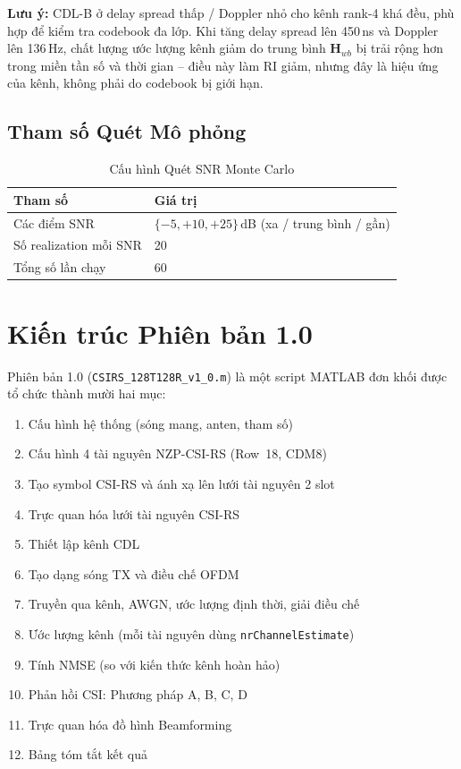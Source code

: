 \documentclass[11pt,a4paper]{article}
\begin{document}
\noindent\textbf{Lưu ý:} CDL-B ở delay spread thấp / Doppler nhỏ cho kênh rank-4
khá đều, phù hợp để kiểm tra codebook đa lớp. Khi tăng delay spread lên 450\,ns
và Doppler lên 136\,Hz, chất lượng ước lượng kênh giảm do trung bình $\mathbf{H}_{wb}$
bị trải rộng hơn trong miền tần số và thời gian -- điều này làm RI giảm, nhưng đây
là hiệu ứng của kênh, không phải do codebook bị giới hạn.

\subsection{Tham số Quét Mô phỏng}

\begin{table}[h!]
\centering
\caption{Cấu hình Quét SNR Monte Carlo}
\label{tab:sweep}
\begin{tabular}{ll}
\toprule
\textbf{Tham số} & \textbf{Giá trị} \\
\midrule
Các điểm SNR & $\{-5, +10, +25\}$\,dB (xa / trung bình / gần) \\
Số realization mỗi SNR & 20 \\
Tổng số lần chạy & 60 \\
\bottomrule
\end{tabular}
\end{table}

\section{Kiến trúc Phiên bản 1.0}

Phiên bản 1.0 (\texttt{CSIRS\_128T128R\_v1\_0.m}) là một script MATLAB đơn khối
được tổ chức thành mười hai mục:

\begin{enumerate}[noitemsep]
    \item Cấu hình hệ thống (sóng mang, anten, tham số)
    \item Cấu hình 4 tài nguyên NZP-CSI-RS (Row~18, CDM8)
    \item Tạo symbol CSI-RS và ánh xạ lên lưới tài nguyên 2 slot
    \item Trực quan hóa lưới tài nguyên CSI-RS
    \item Thiết lập kênh CDL
    \item Tạo dạng sóng TX và điều chế OFDM
    \item Truyền qua kênh, AWGN, ước lượng định thời, giải điều chế
    \item Ước lượng kênh (mỗi tài nguyên dùng \texttt{nrChannelEstimate})
    \item Tính NMSE (so với kiến thức kênh hoàn hảo)
    \item Phản hồi CSI: Phương pháp A, B, C, D
    \item Trực quan hóa đồ hình Beamforming
    \item Bảng tóm tắt kết quả
\end{enumerate}
\end{document}
